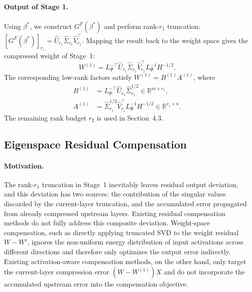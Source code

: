 \documentclass[a4paper,fleqn]{cas-dc}
\begin{document}
\paragraph{Output of Stage 1.}
Using $\beta^*$, we construct $G^F(\beta^*)$ and perform rank-$r_1$ truncation:
$[G^F(\beta^*)]_{r_1} = \hat{U}_{r_1}\hat{\Sigma}_{r_1}\hat{V}_{r_1}^\top$.
Mapping the result back to the weight space gives the compressed weight of Stage~1:
\begin{equation}
W^{(1)} = L_\Psi^{-\top} \hat{U}_{r_1}\hat{\Sigma}_{r_1}\hat{V}_{r_1}^\top L_\Phi^{-1} H^{-1/2}.
\label{eq:stage1-output}
\end{equation}
The corresponding low-rank factors satisfy $W^{(1)} = B^{(1)}A^{(1)}$, where
\begin{equation}
\begin{aligned}
B^{(1)} &= L_\Psi^{-\top}\hat{U}_{r_1}\hat{\Sigma}_{r_1}^{1/2} \in \mathbb{R}^{m \times r_1}, \\
A^{(1)} &= \hat{\Sigma}_{r_1}^{1/2}\hat{V}_{r_1}^\top L_\Phi^{-1} H^{-1/2} \in \mathbb{R}^{r_1 \times n}.
\end{aligned}
\label{eq:stage1-factors}
\end{equation}
The remaining rank budget $r_2$ is used in Section~4.3.

\subsection{Eigenspace Residual Compensation}

\paragraph{Motivation.}
The rank-$r_1$ truncation in Stage~1 inevitably leaves residual output deviation, and this deviation has two sources: the contribution of the singular values discarded by the current-layer truncation, and the accumulated error propagated from already compressed upstream layers. Existing residual compensation methods do not fully address this composite deviation. Weight-space compensation, such as directly applying truncated SVD to the weight residual $W-W'$, ignores the non-uniform energy distribution of input activations across different directions and therefore only optimizes the output error indirectly. Existing activation-aware compensation methods, on the other hand, only target the current-layer compression error $(W-W^{(1)})X$ and do not incorporate the accumulated upstream error into the compensation objective.
\end{document}
